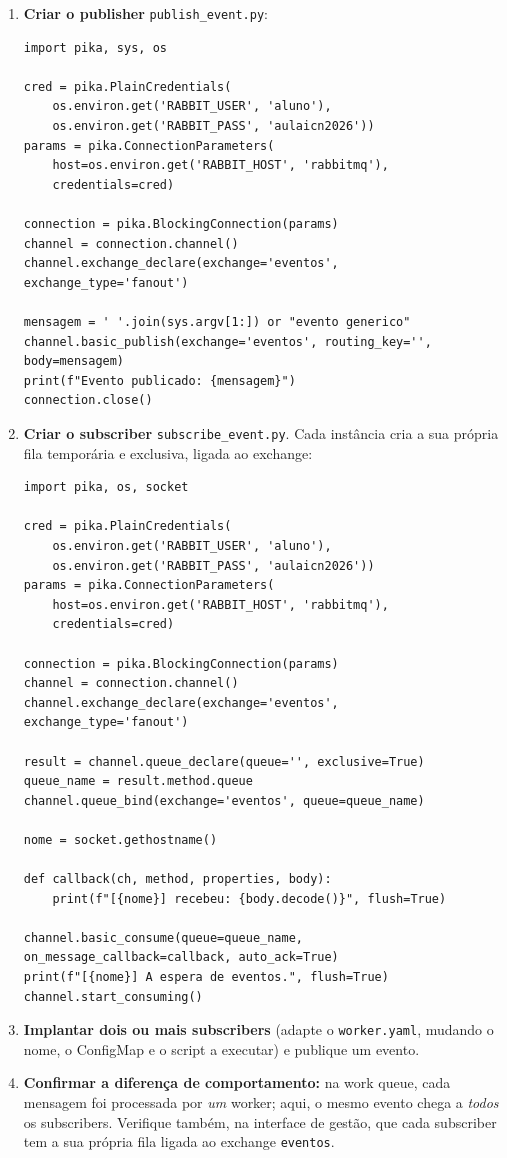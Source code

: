 \documentclass[11pt,a4paper]{article}
\begin{document}
\begin{enumerate}[label=\arabic*.,resume]

  \item \textbf{Criar o publisher} \texttt{publish\_event.py}:
\begin{lstlisting}
import pika, sys, os

cred = pika.PlainCredentials(
    os.environ.get('RABBIT_USER', 'aluno'),
    os.environ.get('RABBIT_PASS', 'aulaicn2026'))
params = pika.ConnectionParameters(
    host=os.environ.get('RABBIT_HOST', 'rabbitmq'),
    credentials=cred)

connection = pika.BlockingConnection(params)
channel = connection.channel()
channel.exchange_declare(exchange='eventos', exchange_type='fanout')

mensagem = ' '.join(sys.argv[1:]) or "evento generico"
channel.basic_publish(exchange='eventos', routing_key='', body=mensagem)
print(f"Evento publicado: {mensagem}")
connection.close()
\end{lstlisting}

  \item \textbf{Criar o subscriber} \texttt{subscribe\_event.py}. Cada instância cria a sua própria fila temporária e exclusiva, ligada ao exchange:
\begin{lstlisting}
import pika, os, socket

cred = pika.PlainCredentials(
    os.environ.get('RABBIT_USER', 'aluno'),
    os.environ.get('RABBIT_PASS', 'aulaicn2026'))
params = pika.ConnectionParameters(
    host=os.environ.get('RABBIT_HOST', 'rabbitmq'),
    credentials=cred)

connection = pika.BlockingConnection(params)
channel = connection.channel()
channel.exchange_declare(exchange='eventos', exchange_type='fanout')

result = channel.queue_declare(queue='', exclusive=True)
queue_name = result.method.queue
channel.queue_bind(exchange='eventos', queue=queue_name)

nome = socket.gethostname()

def callback(ch, method, properties, body):
    print(f"[{nome}] recebeu: {body.decode()}", flush=True)

channel.basic_consume(queue=queue_name, on_message_callback=callback, auto_ack=True)
print(f"[{nome}] A espera de eventos.", flush=True)
channel.start_consuming()
\end{lstlisting}

  \item \textbf{Implantar dois ou mais subscribers} (adapte o \texttt{worker.yaml}, mudando o nome, o ConfigMap e o script a executar) e publique um evento.

  \item \textbf{Confirmar a diferença de comportamento:} na work queue, cada mensagem foi processada por \emph{um} worker; aqui, o mesmo evento chega a \emph{todos} os subscribers. Verifique também, na interface de gestão, que cada subscriber tem a sua própria fila ligada ao exchange \texttt{eventos}.

\end{enumerate}
\end{document}
